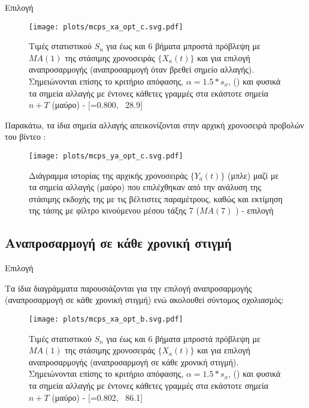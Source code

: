 Επιλογή 

\begin{figure}[H]
    \begin{center}
        \texttt{[image: plots/mcps\_xa\_opt\_c.svg.pdf]}
        \caption{Τιμές στατιστικού $S_n$ για έως και 6 βήματα μπροστά πρόβλεψη με $MA(1)$ της στάσιμης χρονοσειράς $\{X_a(t)\}$ και για επιλογή αναπροσαρμογής  (αναπροσαρμογή όταν βρεθεί σημείο αλλαγής). Σημειώνονται επίσης το κριτήριο απόφασης, $\alpha=1.5*s_x$, () και φυσικά τα σημεία αλλαγής με έντονες κάθετες γραμμές στα εκάστοτε σημεία $n+T$ (μαύρο) - [=0.800, \ 28.9]}
        \label{fig:mcps_xa_opt_c}
    \end{center}
\end{figure}

Παρακάτω, τα ίδια σημεία αλλαγής απεικονίζονται στην αρχική χρονοσειρά προβολών του βίντεο :

\begin{figure}[H]
    \begin{center}
        \texttt{[image: plots/mcps\_ya\_opt\_c.svg.pdf]}
        \caption{Διάγραμμα ιστορίας της αρχικής χρονοσειράς $\{Y_a(t)\}$ (μπλε) μαζί με τα σημεία αλλαγής (μαύρο) που επιλέχθηκαν από την ανάλυση της στάσιμης εκδοχής της με τις βέλτιστες παραμέτρους, καθώς και εκτίμηση της τάσης με φίλτρο κινούμενου μέσου τάξης 7 ($MA(7)$ ) - επιλογή }
        \label{fig:mcps_ya_opt_c}
    \end{center}
\end{figure}


\subsection{Αναπροσαρμογή σε κάθε χρονική στιγμή}

Επιλογή 

\par Τα ίδια διαγράμματα παρουσιάζονται για την επιλογή αναπροσαρμογής  (αναπροσαρμογή σε κάθε χρονική στιγμή) ενώ ακολουθεί σύντομος σχολιασμός:

\begin{figure}[H]
    \begin{center}
        \texttt{[image: plots/mcps\_xa\_opt\_b.svg.pdf]}
        \caption{Τιμές στατιστικού $S_n$ για έως και 6 βήματα μπροστά πρόβλεψη με $MA(1)$ της στάσιμης χρονοσειράς $\{X_a(t)\}$ και για επιλογή αναπροσαρμογής  (αναπροσαρμογή σε κάθε χρονική στιγμή). Σημειώνονται επίσης το κριτήριο απόφασης, $\alpha=1.5*s_x$, () και φυσικά τα σημεία αλλαγής με έντονες κάθετες γραμμές στα εκάστοτε σημεία $n+T$ (μαύρο) - [=0.802, \ 86.1]}
        \label{fig:mcps_xa_opt_b}
    \end{center}
\end{figure}

